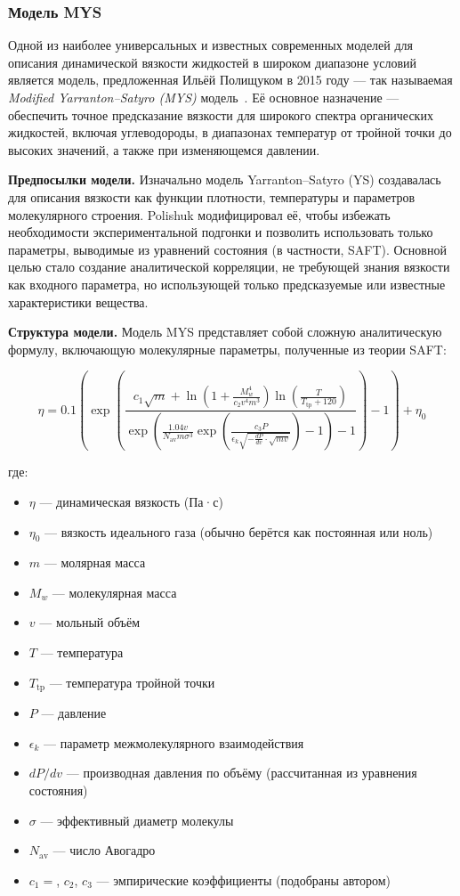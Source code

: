 \documentclass[a4paper,12pt]{article}
\begin{document}
    \subsubsection{Модель MYS}

Одной из наиболее универсальных и известных современных моделей для описания динамической вязкости жидкостей в широком диапазоне условий является модель, предложенная Ильёй Полищуком в 2015 году — так называемая \textit{Modified Yarranton–Satyro (MYS)} модель~\cite{polishuk2015viscosity}. Её основное назначение — обеспечить точное предсказание вязкости для широкого спектра органических жидкостей, включая углеводороды, в диапазонах температур от тройной точки до высоких значений, а также при изменяющемся давлении.

\textbf{Предпосылки модели.}  
Изначально модель Yarranton–Satyro (YS) создавалась для описания вязкости как функции плотности, температуры и параметров молекулярного строения. Polishuk модифицировал её, чтобы избежать необходимости экспериментальной подгонки и позволить использовать только параметры, выводимые из уравнений состояния (в частности, SAFT). Основной целью стало создание аналитической корреляции, не требующей знания вязкости как входного параметра, но использующей только предсказуемые или известные характеристики вещества.

\textbf{Структура модели.}  
Модель MYS представляет собой сложную аналитическую формулу, включающую молекулярные параметры, полученные из теории SAFT:

\[
\eta = 0.1 \left( \exp \left( \frac{c_1 \sqrt{m} + \ln \left( 1 + \frac{M_w^4}{c_2 v^4 m^3} \right) \ln \left( \frac{T}{T_{\text{tp}} + 120} \right)}{
\exp \left( \frac{1.04 v}{N_{\text{av}} m \sigma^3} \exp \left( \frac{c_3 P}{\epsilon_k \sqrt{-\frac{dP}{dv} \cdot \sqrt{m v}}} \right) - 1 \right) - 1} 
\right) - 1 \right) + \eta_0
\]

где:  
\begin{itemize}
  \item $\eta$ — динамическая вязкость (Па·с)
  \item $\eta_0$ — вязкость идеального газа (обычно берётся как постоянная или ноль)
  \item $m$ — молярная масса
  \item $M_w$ — молекулярная масса
  \item $v$ — мольный объём
  \item $T$ — температура
  \item $T_{\text{tp}}$ — температура тройной точки
  \item $P$ — давление
  \item $\epsilon_k$ — параметр межмолекулярного взаимодействия
  \item $dP/dv$ — производная давления по объёму (рассчитанная из уравнения состояния)
  \item $\sigma$ — эффективный диаметр молекулы
  \item $N_{\text{av}}$ — число Авогадро
  \item $c_1=$, $c_2$, $c_3$ — эмпирические коэффициенты (подобраны автором)
\end{itemize}
\end{document}
